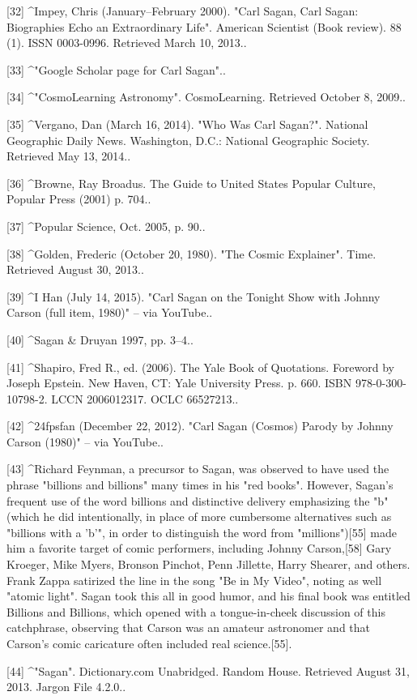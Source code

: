 [32]
^Impey, Chris (January–February 2000). "Carl Sagan, Carl Sagan: Biographies Echo an Extraordinary Life". American Scientist (Book review). 88 (1). ISSN 0003-0996. Retrieved March 10, 2013..

[33]
^"Google Scholar page for Carl Sagan"..

[34]
^"CosmoLearning Astronomy". CosmoLearning. Retrieved October 8, 2009..

[35]
^Vergano, Dan (March 16, 2014). "Who Was Carl Sagan?". National Geographic Daily News. Washington, D.C.: National Geographic Society. Retrieved May 13, 2014..

[36]
^Browne, Ray Broadus. The Guide to United States Popular Culture, Popular Press (2001) p. 704..

[37]
^Popular Science, Oct. 2005, p. 90..

[38]
^Golden, Frederic (October 20, 1980). "The Cosmic Explainer". Time. Retrieved August 30, 2013..

[39]
^I Han (July 14, 2015). "Carl Sagan on the Tonight Show with Johnny Carson (full item, 1980)" – via YouTube..

[40]
^Sagan & Druyan 1997, pp. 3–4..

[41]
^Shapiro, Fred R., ed. (2006). The Yale Book of Quotations. Foreword by Joseph Epstein. New Haven, CT: Yale University Press. p. 660. ISBN 978-0-300-10798-2. LCCN 2006012317. OCLC 66527213..

[42]
^24fpsfan (December 22, 2012). "Carl Sagan (Cosmos) Parody by Johnny Carson (1980)" – via YouTube..

[43]
^Richard Feynman, a precursor to Sagan, was observed to have used the phrase "billions and billions" many times in his "red books". However, Sagan's frequent use of the word billions and distinctive delivery emphasizing the "b" (which he did intentionally, in place of more cumbersome alternatives such as "billions with a 'b'", in order to distinguish the word from "millions")[55] made him a favorite target of comic performers, including Johnny Carson,[58] Gary Kroeger, Mike Myers, Bronson Pinchot, Penn Jillette, Harry Shearer, and others. Frank Zappa satirized the line in the song "Be in My Video", noting as well "atomic light". Sagan took this all in good humor, and his final book was entitled Billions and Billions, which opened with a tongue-in-cheek discussion of this catchphrase, observing that Carson was an amateur astronomer and that Carson's comic caricature often included real science.[55].

[44]
^"Sagan". Dictionary.com Unabridged. Random House. Retrieved August 31, 2013. Jargon File 4.2.0..

